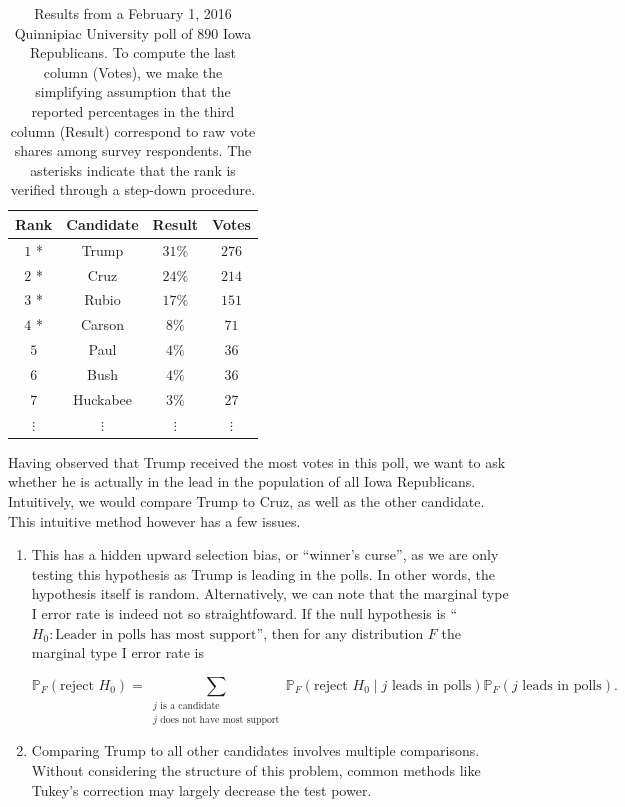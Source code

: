 \documentclass[11pt]{article}
\newcommand{\PP}{\mathbb{P}}
\begin{document}
\begin{table}[htbp]
\begin{center}
\begin{tabular}{c c c c}
	\hline
	Rank & Candidate & Result & Votes \\
	\hline
	$1$ * & Trump & $31\%$ & $276$ \\
	$2$ * & Cruz & $24\%$ & $214$ \\
	$3$ * & Rubio & $17\%$ & $151$ \\
	$4$ * & Carson & $8\%$ & $71$ \\
	$5$ & Paul & $4\%$ & $36$ \\
	$6$ & Bush & $4\%$ & $36$ \\
	$7$ & Huckabee & $3\%$ & $27$ \\
	$\vdots$ & $\vdots$ & $\vdots $ & $\vdots$ \\
	\hline
\end{tabular}
\end{center}
\caption{Results from a February 1, 2016 Quinnipiac University poll of $890$ Iowa Republicans. To compute the last column (Votes), we make the simplifying assumption that the reported percentages in the third column (Result) correspond to raw vote shares among survey respondents. The asterisks indicate that the rank is verified through a step-down procedure.}
\label{tbl:poll}
\end{table}

Having observed that Trump received the most votes in this poll, we want to ask whether he is actually in the lead in the population of all Iowa Republicans. Intuitively, we would compare Trump to Cruz, as well as the other candidate. This intuitive method however has a few issues.

\begin{enumerate}

\item This has a hidden upward selection bias, or ``winner's curse'', as we are only testing this hypothesis as Trump is leading in the polls. In other words, the hypothesis itself is random. Alternatively, we can note that the marginal type I error rate is indeed not so straightfoward. If the null hypothesis is ``$H_0: \text{Leader in polls has most support}$'', then for any distribution $F$ the marginal type I error rate is

\begin{equation}
\PP_F\left(\text{reject } H_0\right) = \sum_{\substack{j \text{ is a candidate} \\ j \text{ does not have most support}}} \PP_F\left(\text{reject } H_0 \middle| j \text{ leads in polls}\right) \PP_F \left(j \text{ leads in polls}\right).
\label{eqn:marginal_error}
\end{equation}

\item Comparing Trump to all other candidates involves multiple comparisons. Without considering the structure of this problem, common methods like Tukey's correction \cite{Tukey:1951} may largely decrease the test power.

\end{enumerate}
\end{document}
